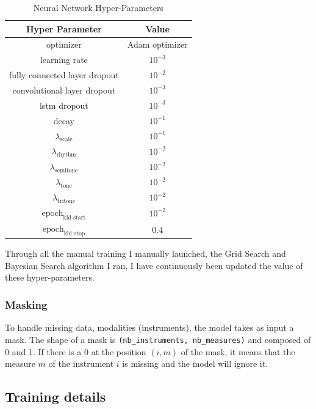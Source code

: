 \documentclass[12pt]{report}
\begin{document}
\begin{table}[htbp]
    \centering
    \begin{tabular}{c|c}
        Hyper Parameter & Value \\
        \hline
        optimizer &  Adam optimizer \cite{brownlee_gentle_2017, bushaev_adam_2018, kingma_adam_2017} \\
        learning rate & $10^{-3}$ \\
        fully connected layer dropout & $10^{-2}$ \\
        convolutional layer dropout & $10^{-3}$ \\
        lstm dropout & $10^{-3}$ \\
        decay & $10^{-1}$ \\
        $\lambda_{\text{scale}}$ & $10^{-1}$ \\
        $\lambda_{\text{rhythm}}$ & $10^{-2}$ \\
        $\lambda_{\text{semitone}}$ & $10^{-2}$ \\
        $\lambda_{\text{tone}}$ & $10^{-2}$ \\
        $\lambda_{\text{tritone}}$ & $10^{-2}$ \\
        $\text{epoch}_{\text{kld start}}$ & $10^{-2}$ \\
        $\text{epoch}_{\text{kld stop}}$ & $0.4$ \\
    \end{tabular}
    \caption{Neural Network Hyper-Parameters}
    \label{tab:network-hp}
\end{table}

Through all the manual training I manually launched, the Grid Search and Bayesian Search algorithm I ran, I have continuously been updated the value of these hyper-parameters.

\subsubsection{Masking}

To handle missing data, modalities (instruments), the model takes as input a mask.
The shape of a mask is \texttt{(nb\_instruments, nb\_measures)} and composed of 0 and 1.
If there is a 0 at the position $(i, m)$ of the mask, it means that the measure $m$ of the instrument $i$ is missing and the model will ignore it.


\subsection{Training details}
\end{document}
